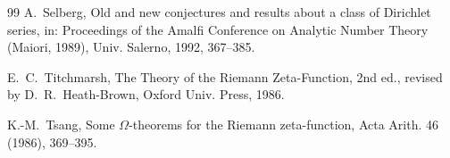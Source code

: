 \documentclass[11pt]{article}
\begin{document}
\begin{thebibliography}{99}
 A.~Selberg, Old and new conjectures and results about a class of Dirichlet series, in: Proceedings of the Amalfi Conference on Analytic Number Theory (Maiori, 1989), Univ. Salerno, 1992, 367--385.

 E.~C.~Titchmarsh, The Theory of the Riemann Zeta-Function, 2nd ed., revised by D.~R.~Heath-Brown, Oxford Univ. Press, 1986.

 K.-M.~Tsang, Some $\Omega$-theorems for the Riemann zeta-function, Acta Arith. 46 (1986), 369--395.

\end{thebibliography}
\end{document}
